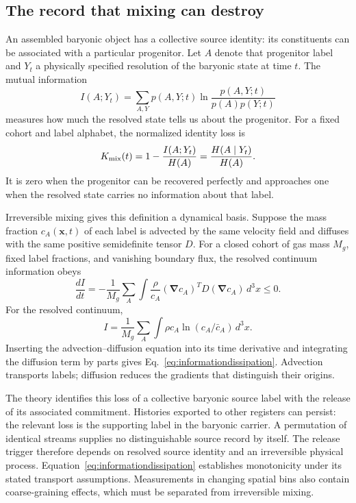 \subsection{The record that mixing can destroy}

An assembled baryonic object has a collective source identity: its
constituents can be associated with a particular progenitor. Let $A$
denote that progenitor label and $Y_t$ a physically specified resolution
of the baryonic state at time $t$. The mutual information
\begin{equation}
I(A;Y_t)=\sum_{A,Y}p(A,Y;t)
\ln\frac{p(A,Y;t)}{p(A)p(Y;t)}
\end{equation}
measures how much the resolved state tells us about the progenitor.
For a fixed cohort and label alphabet, the normalized identity loss is
\begin{equation}
K_{\rm mix}(t)=1-\frac{I(A;Y_t)}{H(A)}
=\frac{H(A\mid Y_t)}{H(A)}.
\label{eq:informationkernel}
\end{equation}
It is zero when the progenitor can be recovered perfectly and approaches
one when the resolved state carries no information about that label.

Irreversible mixing gives this definition a dynamical basis. Suppose the
mass fraction $c_A(\boldsymbol x,t)$ of each label is advected by the same
velocity field and diffuses with the same positive semidefinite tensor
$D$. For a closed cohort of gas mass $M_g$, fixed label fractions, and
vanishing boundary flux, the resolved continuum information obeys
\begin{equation}
\frac{dI}{dt}=-\frac{1}{M_g}\sum_A
\int \frac{\rho}{c_A}
(\boldsymbol\nabla c_A)^T D(\boldsymbol\nabla c_A)\,d^3x\le0.
\label{eq:informationdissipation}
\end{equation}
For the resolved continuum,
\begin{equation}
I=\frac{1}{M_g}\sum_A\int\rho c_A\ln(c_A/\bar c_A)\,d^3x.
\end{equation}
Inserting the advection--diffusion equation into its time derivative and
integrating the diffusion term by parts gives
Eq.~\eqref{eq:informationdissipation}. Advection transports labels; diffusion
reduces the gradients that distinguish their origins.

The theory identifies this loss of a collective baryonic source label
with the release of its associated commitment. Histories exported to
other registers can persist: the relevant loss is the supporting label
in the baryonic carrier. A permutation of identical streams supplies no
distinguishable source record by itself. The release trigger therefore
depends on resolved source identity and an irreversible physical process.
Equation~\eqref{eq:informationdissipation} establishes monotonicity under
its stated transport assumptions. Measurements in changing spatial bins
also contain coarse-graining effects, which must be separated from
irreversible mixing. 

